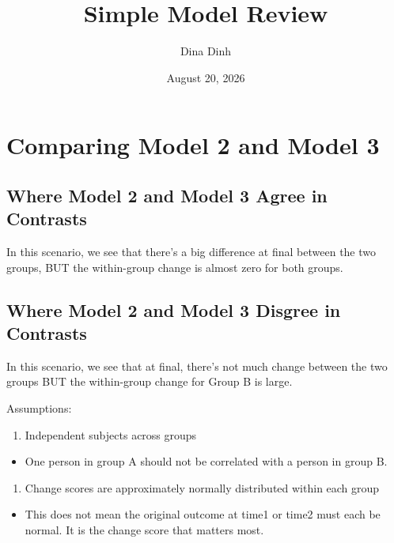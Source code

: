 \documentclass[
]{article}
\title{Simple Model Review}
\author{Dina Dinh}
\date{August 20, 2026}
\providecommand{\tightlist}{%
  \setlength{\itemsep}{0pt}\setlength{\parskip}{0pt}}
\begin{document}
\maketitle

\section{Comparing Model 2 and Model
3}\label{comparing-model-2-and-model-3}

\subsection{Where Model 2 and Model 3 Agree in
Contrasts}\label{where-model-2-and-model-3-agree-in-contrasts}

In this scenario, we see that there's a big difference at final between
the two groups, BUT the within-group change is almost zero for both
groups.

\subsection{Where Model 2 and Model 3 Disgree in
Contrasts}\label{where-model-2-and-model-3-disgree-in-contrasts}

In this scenario, we see that at final, there's not much change between
the two groups BUT the within-group change for Group B is large.

Assumptions:

\begin{enumerate}
\def\labelenumi{\arabic{enumi}.}
\tightlist
\item
  Independent subjects across groups
\end{enumerate}

\begin{itemize}
\tightlist
\item
  One person in group A should not be correlated with a person in group
  B.
\end{itemize}

\begin{enumerate}
\def\labelenumi{\arabic{enumi}.}
\setcounter{enumi}{1}
\tightlist
\item
  Change scores are approximately normally distributed within each group
\end{enumerate}

\begin{itemize}
\tightlist
\item
  This does not mean the original outcome at time1 or time2 must each be
  normal. It is the change score that matters most.
\end{itemize}
\end{document}
